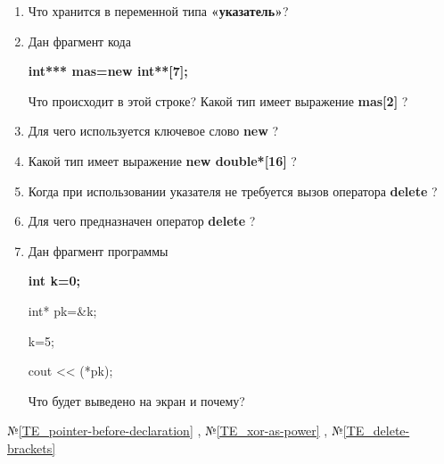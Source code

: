 \begin{enumerate}

	\item Что хранится в переменной типа {\bf  «указатель»}?

	\item Дан фрагмент кода

	{\bf int*** mas=new int**[7];}

	Что происходит в этой строке?
	Какой тип имеет выражение  {\bf mas[2] }?

	\item Для чего используется ключевое слово  {\bf new }?

	\item Какой тип имеет выражение  {\bf new double*[16] }?

	\item  Когда при использовании указателя не требуется вызов оператора {\bf delete} ?

	\item  Для чего предназначен оператор  {\bf delete} ?

	\item Дан фрагмент программы

		    {\bf
		       int k=0;

		       int* pk=\&k;

		       k=5;

		       cout <\!< (*pk);
				}

	Что будет выведено на экран и почему?

\end{enumerate}

\typerrors
№\ref{TE_pointer-before-declaration}%
, №\ref{TE_xor-as-power}%
, №\ref{TE_delete-brackets}%

